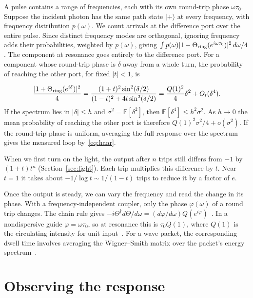 \documentclass[acmsmall,screen,review,anonymous,nonacm]{acmart}
\newcommand{\ket}[1]{\lvert #1\rangle}
\numberwithin{equation}{section}
\begin{document}
A pulse contains a range of frequencies, each with its own round-trip phase
$\omega\tau_0$. Suppose the incident photon has the same path state $\ket+$
at every frequency, with frequency distribution $p(\omega)$. We count arrivals
at the difference port over the entire pulse. Since distinct frequency modes are orthogonal,
ignoring frequency adds their probabilities, weighted by $p(\omega)$, giving $\int p(\omega)|1-\Theta_{\rm ring}(e^{i\omega\tau_0})|^2\,d\omega/4$.
The component at resonance goes entirely to the difference port. For a component
whose round-trip phase is $\delta$ away from a whole turn, the probability of reaching
the other port, for fixed $|t|<1$, is

\[
 \frac{|1+\Theta_{\rm ring}(e^{i\delta})|^2}{4}
 =\frac{(1+t)^2\sin^2(\delta/2)}{(1-t)^2+4t\sin^2(\delta/2)}
 =\frac{Q(1)^2}{4}\delta^2+O_t(\delta^4).
\]
If the spectrum lies in $|\delta|\le h$ and $\sigma^2=\mathbb E[\delta^2]$,
then $\mathbb E[\delta^4]\le h^2\sigma^2$. As $h\to0$ the mean probability of reaching the other port
is therefore $Q(1)^2\sigma^2/4+o(\sigma^2)$. If the round-trip phase is uniform, averaging the full response over the spectrum
gives the measured loop by~\eqref{eq:haar}.

When we first turn on the light, the output after $n$ trips still differs from $-1$
by $(1+t)t^n$ (Section~\ref{sec:light}). Each trip multiplies this difference by $t$.
Near $t=1$ it takes about $-1/\log t\sim1/(1-t)$ trips to reduce it by a factor of $e$.

Once the output is steady, we can vary the frequency and read the change in its phase.
With a frequency-independent coupler, only the phase $\varphi(\omega)$ of a round trip changes.
The chain rule gives $-i\Theta^\dagger d\Theta/d\omega=(d\varphi/d\omega)Q(e^{i\varphi})$~\cite{Wigner55Phase,Smith60LifetimeMatrix}.
In a nondispersive guide $\varphi=\omega\tau_0$, so at resonance this is $\tau_0 Q(1)$, where $Q(1)$ is the circulating intensity for unit input~\cite[Eq.~(7)]{HeebnerBoyd99Ring}.
For a wave packet, the corresponding dwell time involves averaging the Wigner--Smith matrix over the packet's energy spectrum~\cite[Eqs.~(34)--(35)]{FyodorovSommers97Delay}.

\section{Observing the response}\label{app:observing}
\end{document}
